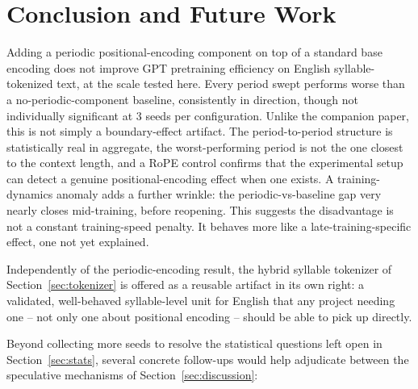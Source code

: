 \documentclass[11pt]{article}
\begin{document}
\section{Conclusion and Future Work}
\label{sec:conclusion}

Adding a periodic positional-encoding component on top of a standard base encoding does not improve GPT pretraining efficiency on English syllable-tokenized text, at the scale tested here. Every period swept performs worse than a no-periodic-component baseline, consistently in direction, though not individually significant at 3 seeds per configuration. Unlike the companion paper, this is not simply a boundary-effect artifact. The period-to-period structure is statistically real in aggregate, the worst-performing period is not the one closest to the context length, and a RoPE control confirms that the experimental setup can detect a genuine positional-encoding effect when one exists. A training-dynamics anomaly adds a further wrinkle: the periodic-vs-baseline gap very nearly closes mid-training, before reopening. This suggests the disadvantage is not a constant training-speed penalty. It behaves more like a late-training-specific effect, one not yet explained.

Independently of the periodic-encoding result, the hybrid syllable tokenizer of Section~\ref{sec:tokenizer} is offered as a reusable artifact in its own right: a validated, well-behaved syllable-level unit for English that any project needing one -- not only one about positional encoding -- should be able to pick up directly.

Beyond collecting more seeds to resolve the statistical questions left open in Section~\ref{sec:stats}, several concrete follow-ups would help adjudicate between the speculative mechanisms of Section~\ref{sec:discussion}:
\end{document}
